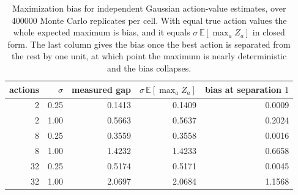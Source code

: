 \begin{table}[h]
\centering
\caption{Maximization bias for independent Gaussian action-value estimates, over 400000 Monte Carlo replicates per cell. With equal true action values the whole expected maximum is bias, and it equals $\sigma\,\mathbb{E}[\max_a Z_a]$ in closed form. The last column gives the bias once the best action is separated from the rest by one unit, at which point the maximum is nearly deterministic and the bias collapses.}
\label{tab:prelim_jensen}
\begin{tabular}{rrrrr}
\hline
actions & $\sigma$ & measured gap & $\sigma\,\mathbb{E}[\max_a Z_a]$ & bias at separation $1$ \\
\hline
2 & 0.25 & 0.1413 & 0.1409 & 0.0009 \\
2 & 1.00 & 0.5663 & 0.5637 & 0.2024 \\
8 & 0.25 & 0.3559 & 0.3558 & 0.0016 \\
8 & 1.00 & 1.4232 & 1.4233 & 0.6658 \\
32 & 0.25 & 0.5174 & 0.5171 & 0.0045 \\
32 & 1.00 & 2.0697 & 2.0684 & 1.1568 \\
\hline
\end{tabular}
\end{table}

